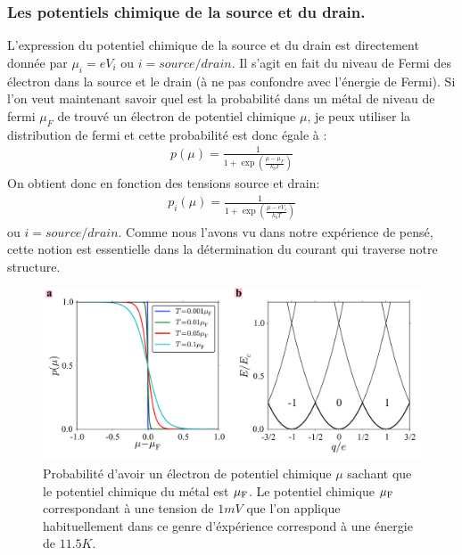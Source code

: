 \subsubsection{Les potentiels chimique de la source et du drain.}
L'expression du potentiel chimique de la source et du drain est directement donnée par $\mu_i = e V_i$ ou $i=source/drain$. Il s'agit en fait du niveau de Fermi des électron dans la source et le drain (à ne pas confondre avec l'énergie de Fermi). Si l'on veut maintenant savoir quel est la probabilité dans un métal de niveau de fermi $\mu_F$ de trouvé un électron de potentiel chimique $\mu$, je peux utiliser la distribution de fermi et cette probabilité est donc égale à :
\begin{eqnarray}
p(\mu) = \frac{1}{1 + \exp{(\frac{\mu - \mu_F}{k_bT})}} \nonumber
\end{eqnarray}
 On obtient donc en fonction des tensions source et drain:
\begin{eqnarray}
p_i(\mu) = \frac{1}{1 + \exp{(\frac{\mu - eV_i}{k_bT})}}
\end{eqnarray}
ou $i=source/drain$. Comme nous l'avons vu dans notre expérience de pensé, cette notion est essentielle dans la détermination du courant qui traverse notre structure.

\begin{figure}
\centering \includegraphics[scale=0.5]{Theorie/Transport/figure2/figure2.pdf} 
\caption{Probabilité d'avoir un électron de potentiel chimique $\mu$ sachant que le potentiel chimique du métal est $\mu_{\rm{F}}$. Le potentiel chimique $\mu_{\rm{F}}$ correspondant à une tension de $1mV$ que l'on applique habituellement dans ce genre d'éxpérience correspond à une énergie de $11.5K$.}
\label{distrib_fermi}
\end{figure}



